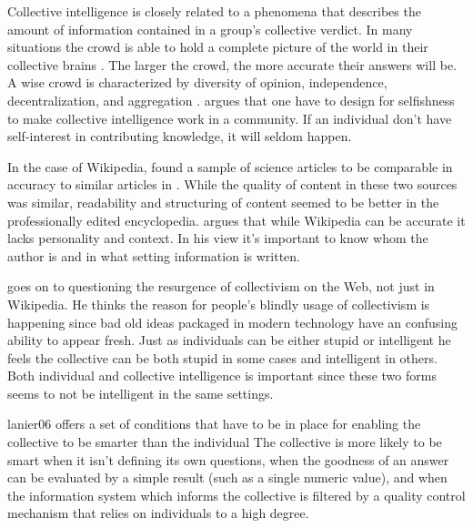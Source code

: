 Collective intelligence is closely related to
\dash{}a phenomena that describes the amount of
information contained in a group's collective verdict.
In many situations the crowd is able to hold a complete picture of the world
in their collective brains \citep[]{surowiecki04}. The larger the
crowd, the more accurate their answers will be.%
A wise crowd is characterized by diversity of opinion, independence,
decentralization, and aggregation \citep[]{surowiecki04}.
\citet{powazek08} argues that one have to design for selfishness to make
collective intelligence work in a community. If an individual don't have
self-interest in contributing knowledge, it will seldom happen.

In the case of Wikipedia, \citet{giles05} found a sample of science articles
to be comparable in accuracy to similar articles in
. While the quality of content in
these two sources was similar, readability and structuring of content seemed
to be better in the professionally edited encyclopedia.
\citet{lanier06} argues that while Wikipedia can be accurate it lacks
personality and context. In his view it's important to know whom the author is
and in what setting information is written.

\citet{lanier06} goes on to questioning the resurgence of collectivism on the
Web, not just in Wikipedia.
He thinks the reason for people's blindly usage of collectivism is happening
since bad old ideas packaged in modern technology have an confusing ability to
appear fresh. Just as individuals can be either
stupid or intelligent he feels the collective can be both stupid in some cases
and intelligent in others. Both individual and collective intelligence is
important since these two forms seems to not be intelligent in the same
settings.

\begin{fullquote}{lanier06}{%
  offers a set of conditions that have to be in place for enabling the
  collective to be smarter than the individual}
    The collective is more likely to be smart when it isn't defining its own
    questions, when the goodness of an answer can be evaluated by a simple
    result (such as a single numeric value), and when the information system
    which informs the collective is filtered by a quality control mechanism
    that relies on individuals to a high degree.
\end{fullquote}

